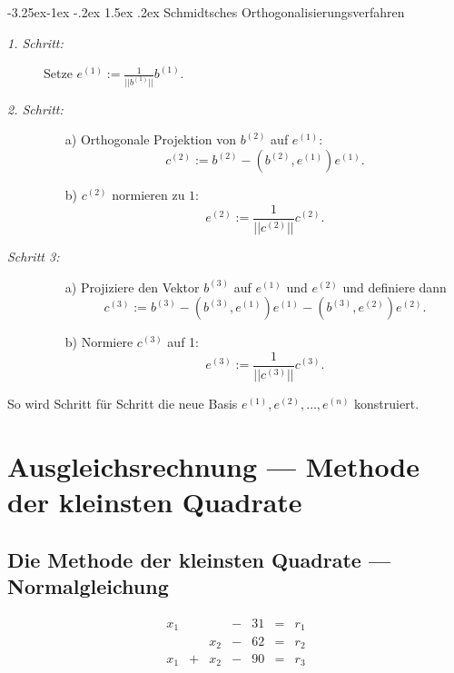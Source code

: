 \documentclass[9pt,fleqn,ngerman,article]{memoir}
\makeatletter
\renewcommand\paragraph{\@startsection{paragraph}{4}{\z@}%
  {-3.25ex\@plus -1ex \@minus -.2ex}%
  {1.5ex \@plus .2ex}%
  {\normalfont\normalsize\bfseries}}
\makeatother
\begin{document}
\begin{multicols*}{3}
			\paragraph{Schmidtsches Orthogonalisierungsverfahren} %
				\begin{description}
					\item[\emph{1. Schritt:}] Setze $e^{(1)} := \frac{1}{||b^{(1)}||} b^{(1)}$.
					\item[\emph{2. Schritt:}]
						\begin{itemize}
							\item[a)] Orthogonale Projektion von $b^{(2)}$ auf $e^{(1)}$:\\ \[
								c^{(2)} := b^{(2)} - (b^{(2)}, e^{(1)}) e^{(1)}.
							\]
							\item[b)] $c^{(2)}$ normieren zu $1$: \[
								e^{(2)} := \frac{1}{||c^{(2)}||} c^{(2)}.
							\]
						\end{itemize}
						
					\item[\emph{Schritt 3:}]
						\begin{itemize}
							\item[a)] Projiziere den Vektor $b^{(3)}$ auf $e^{(1)}$ und $e^{(2)}$ und definiere dann \[
								c^{(3)} := b^{(3)} - (b^{(3)}, e^{(1)}) e^{(1)} - (b^{(3)}, e^{(2)}) e^{(2)}.
							\]
							\item[b)] Normiere $c^{(3)}$ auf 1: \[
								e^{(3)} := \frac{1}{||c^{(3)}||} c^{(3)}.
							\]
						\end{itemize}
				\end{description}
				So wird Schritt für Schritt die neue Basis $e^{(1)},e^{(2)},\dots,e^{(n)}$ konstruiert.
			
		
	
	\section{Ausgleichsrechnung — Methode der kleinsten Quadrate} %
		\subsection{Die Methode der kleinsten Quadrate --- Normalgleichung} %
			\begin{equation*}
				\begin{array}{ccccccc}
					x_1 & & & - & 31 & = & r_1 \\
					 & & x_2 & - & 62 & = & r_2 \\
					x_1 & + & x_2 & - & 90 & = & r_3
				\end{array}
			\end{equation*}
			

\end{multicols*}
\end{document}
